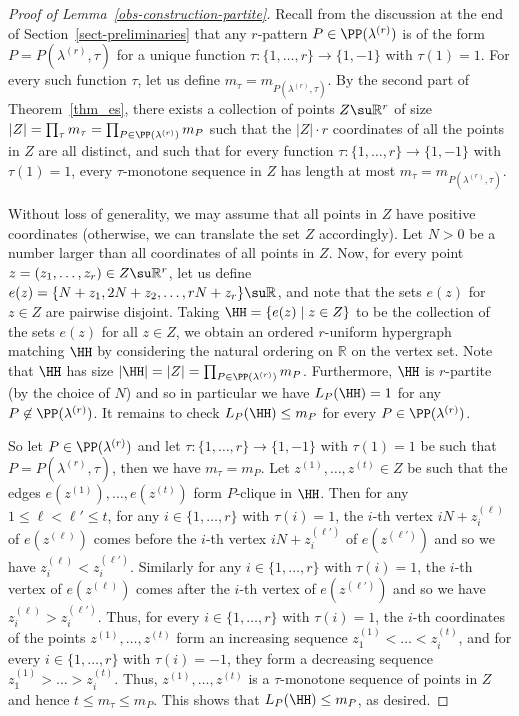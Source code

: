 \begin{proof}[Proof of Lemma~\ref{obs-construction-partite}]
    Recall from the discussion at the end of Section~\ref{sect-preliminaries} that any $r$-pattern $P\in \PP(\lambda^{(r)})$ is of the form $P=P(\lambda^{(r)},\tau)$ for a unique function $\tau:\{1,\dots,r\}\to \{1,-1\}$ with $\tau(1)=1$. For every such function $\tau$, let us define $m_\tau=m_{P(\lambda^{(r)},\tau)}$. By the second part of Theorem~\ref{thm_es}, there exists a collection of points $Z\su \mathbb{R}^r$ of size $|Z|=\prod_{\tau} m_{\tau}=\prod_{P\in \PP(\lambda^{(r)})} m_{P}$ such that the $|Z|\cdot r$ coordinates of all the points in $Z$ are all distinct, and such that for every function $\tau:\{1,\dots,r\}\to \{1,-1\}$ with $\tau(1)=1$, every $\tau$-monotone sequence in $Z$ has length at most $m_\tau=m_{P(\lambda^{(r)},\tau)}$.
    
    Without loss of generality, we may assume that all points in $Z$ have positive coordinates (otherwise, we can translate the set $Z$ accordingly). Let $N>0$ be a number larger than all coordinates of all points in $Z$. Now, for every point $z=(z_1,\dots,z_r)\in Z\su \mathbb{R}^r$, let us define $e(z)=\{N+ z_1, 2N + z_2, \ldots, r N+z_r \}\su \mathbb{R}$, and note that the sets $e(z)$ for $z\in Z$ are pairwise disjoint. Taking $\HH=\{e(z)\mid z\in Z\}$ to be the collection of the sets $e(z)$ for all $z\in Z$, we obtain an ordered $r$-uniform hypergraph matching $\HH$ by considering the natural ordering on $\mathbb{R}$ on the vertex set. Note that $\HH$ has size $|\HH|=|Z|=\prod_{P\in \PP(\lambda^{(r)})} m_{P}$. Furthermore, $\HH$ is $r$-partite (by the choice of $N$) and so in particular we have $L_{P}(\HH)=1$ for any $P\not\in \PP(\lambda^{(r)})$. It remains to check $L_{P}(\HH)\le m_P$ for every $P\in \PP(\lambda^{(r)})$.

    So let $P\in \PP(\lambda^{(r)})$ and let $\tau:\{1,\dots,r\}\to \{1,-1\}$ with $\tau(1)=1$ be such that $P=P(\lambda^{(r)},\tau)$, then we have $m_\tau=m_P$. Let $z^{(1)},\dots,z^{(t)}\in Z$ be such that the edges $e(z^{(1)}),\dots,e(z^{(t)})$ form $P$-clique in $\HH$. Then for any $1\le \ell<\ell'\le t$, for any $i\in \{1,\dots,r\}$ with $\tau(i)=1$, the $i$-th vertex $iN+z^{(\ell)}_i$ of $e(z^{(\ell)})$ comes before the $i$-th vertex $iN+z^{(\ell')}_i$ of $e(z^{(\ell')})$ and so we have $z^{(\ell)}_i<z^{(\ell')}_i$. Similarly for any $i\in \{1,\dots,r\}$ with $\tau(i)=1$, the $i$-th vertex of $e(z^{(\ell)})$ comes after the $i$-th vertex of $e(z^{(\ell')})$ and so we have $z^{(\ell)}_i>z^{(\ell')}_i$. Thus, for every $i\in \{1,\dots,r\}$ with $\tau(i)=1$, the $i$-th coordinates of the points $z^{(1)},\dots,z^{(t)}$ form an increasing sequence 
    $z^{(1)}_1<\dots<z^{(t)}_i$, and for every $i\in \{1,\dots,r\}$ with $\tau(i)=-1$, they form a decreasing sequence $z^{(1)}_1>\dots>z^{(t)}_i$. Thus, $z^{(1)},\dots,z^{(t)}$ is a $\tau$-monotone sequence of points in $Z$ and hence $t\le m_\tau\le m_P$. This shows that $L_P(\HH)\le m_P$, as desired.
\end{proof}

